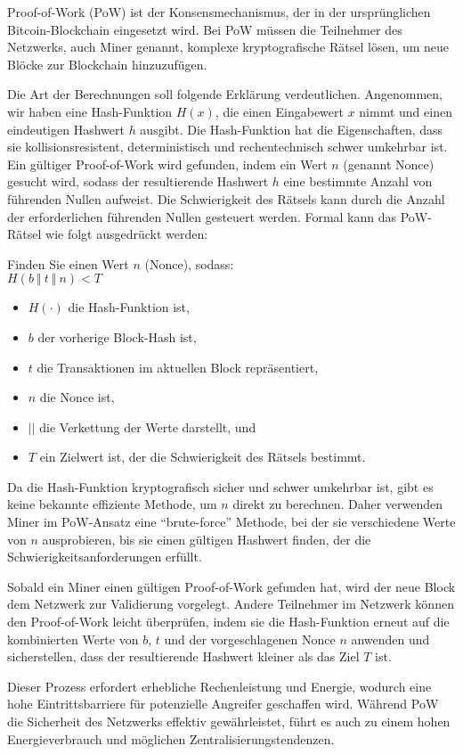 \documentclass[../vs-script-first-v01.tex]{subfiles}
\begin{document}
Proof-of-Work (PoW) ist der Konsensmechanismus, der in der ursprünglichen Bitcoin-Blockchain eingesetzt wird. Bei PoW müssen die Teilnehmer des Netzwerks, auch Miner genannt, komplexe kryptografische Rätsel lösen, um neue Blöcke zur Blockchain hinzuzufügen. 

Die Art der Berechnungen soll folgende Erklärung verdeutlichen. Angenommen, wir haben eine Hash-Funktion $H(x)$, die einen Eingabewert $x$ nimmt und einen eindeutigen Hashwert $h$ ausgibt. Die Hash-Funktion hat die Eigenschaften, dass sie kollisionsresistent, deterministisch und rechentechnisch schwer umkehrbar ist.
Ein gültiger Proof-of-Work wird gefunden, indem ein Wert $n$ (genannt Nonce) gesucht wird, sodass der resultierende Hashwert $h$ eine bestimmte Anzahl von führenden Nullen aufweist. Die Schwierigkeit des Rätsels kann durch die Anzahl der erforderlichen führenden Nullen gesteuert werden. Formal kann das PoW-Rätsel wie folgt ausgedrückt werden:

Finden Sie einen Wert $n$ (Nonce), sodass: \\
$H(b \ \Vert \ t \ \Vert \ n) < T$
\begin{itemize}
\item $H(\cdot)$ die Hash-Funktion ist,
\item $b$ der vorherige Block-Hash ist,
\item $t$ die Transaktionen im aktuellen Block repräsentiert,
\item $n$ die Nonce ist,
\item $||$ die Verkettung der Werte darstellt, und
\item $T$ ein Zielwert ist, der die Schwierigkeit des Rätsels bestimmt.
\end{itemize}
Da die Hash-Funktion kryptografisch sicher und schwer umkehrbar ist, gibt es keine bekannte effiziente Methode, um $n$ direkt zu berechnen. Daher verwenden Miner im PoW-Ansatz eine \enquote{brute-force} Methode, bei der sie verschiedene Werte von $n$ ausprobieren, bis sie einen gültigen Hashwert finden, der die Schwierigkeitsanforderungen erfüllt.

Sobald ein Miner einen gültigen Proof-of-Work gefunden hat, wird der neue Block dem Netzwerk zur Validierung vorgelegt. Andere Teilnehmer im Netzwerk können den Proof-of-Work leicht überprüfen, indem sie die Hash-Funktion erneut auf die kombinierten Werte von $b$, $t$ und der vorgeschlagenen Nonce $n$ anwenden und sicherstellen, dass der resultierende Hashwert kleiner als das Ziel $T$ ist.

Dieser Prozess erfordert erhebliche Rechenleistung und Energie, wodurch eine hohe Eintrittsbarriere für potenzielle Angreifer geschaffen wird. Während PoW die Sicherheit des Netzwerks effektiv gewährleistet, führt es auch zu einem hohen Energieverbrauch und möglichen Zentralisierungstendenzen.
\end{document}
